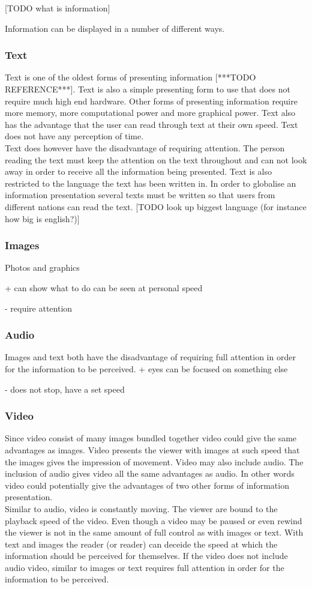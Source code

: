 [TODO what is information]

Information can be displayed in a number of different ways.

\subsubsection{Text}
Text is one of the oldest forms of presenting information [***TODO REFERENCE***]. Text is also a simple presenting form to use that does not require much high end hardware. Other forms of presenting information require more memory, more computational power and more graphical power. Text also has the advantage that the user can read through text at their own speed. Text does not have any perception of time.\\

Text does however have the disadvantage of requiring attention. The person reading the text must keep the attention on the text throughout and can not look away in order to receive all the information being presented. Text is also restricted to the language the text has been written in. In order to globalise an information presentation several texts must be written so that users from different nations can read the text. [TODO look up biggest language (for instance how big is english?)]

\subsubsection{Images}
Photos and graphics

+
can show what to do
can be seen at personal speed

-
require attention

\subsubsection{Audio}
Images and text both have the disadvantage of requiring full attention in order for the information to be perceived. 
+
eyes can be focused on something else

-
does not stop, have a set speed

\subsubsection{Video}
Since video consist of many images bundled together video could give the same advantages as images. Video presents the viewer with images at such speed that the images gives the impression of movement. Video may also include audio. The inclusion of audio gives video all the same advantages as audio. In other words video could potentially give the advantages of two other forms of information presentation.\\

Similar to audio, video is constantly moving. The viewer are bound to the playback speed of the video. Even though a video may be paused or even rewind the viewer is not in the same amount of full control as with images or text. With text and images the reader (or reader) can deceide the speed at which the information should be perceived for themselves. If the video does not include audio video, similar to images or text requires full attention in order for the information to be perceived.